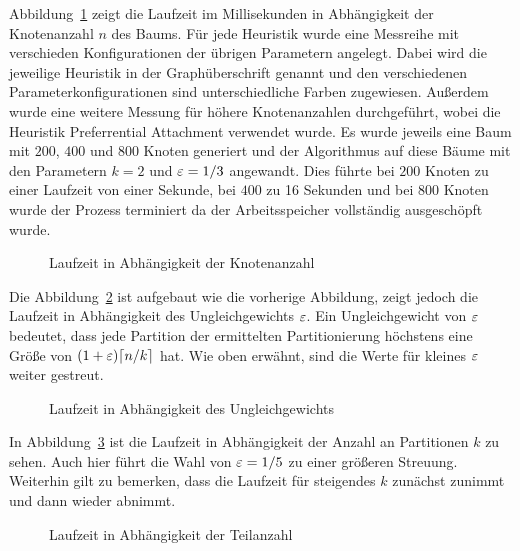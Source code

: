 Abbildung~\ref{fig:runnodes} zeigt die Laufzeit im Millisekunden in Abhängigkeit der Knotenanzahl $n$ des Baums.
Für jede Heuristik wurde eine Messreihe mit verschieden Konfigurationen der übrigen Parametern angelegt.
Dabei wird die jeweilige Heuristik in der Graphüberschrift genannt und den verschiedenen Parameterkonfigurationen sind unterschiedliche Farben zugewiesen. 
 Außerdem wurde eine weitere Messung für höhere Knotenanzahlen durchgeführt, wobei die Heuristik Preferrential Attachment verwendet wurde.
Es wurde jeweils eine Baum mit $200$, $400$ und $800$ Knoten generiert und der Algorithmus auf diese Bäume mit den Parametern $k = 2$ und $\varepsilon = 1/3$ angewandt.
Dies führte bei $200$ Knoten zu einer Laufzeit von einer Sekunde, bei $400$ zu 16 Sekunden und bei $800$ Knoten wurde der Prozess terminiert da der Arbeitsspeicher vollständig ausgeschöpft wurde.
\begin{figure}[t]
    \centering
    \scalebox{0.8}{}
    \caption{Laufzeit in Abhängigkeit der Knotenanzahl}\label{fig:runnodes}
\end{figure}

Die Abbildung~\ref{fig:runimb} ist aufgebaut wie die vorherige Abbildung, zeigt jedoch die Laufzeit in Abhängigkeit des Ungleichgewichts $\varepsilon$.
Ein Ungleichgewicht von $\varepsilon$ bedeutet, dass jede Partition der ermittelten Partitionierung höchstens eine Größe von $(1 + \varepsilon) \lceil n/k\rceil$ hat.
Wie oben erwähnt, sind die Werte für kleines $\varepsilon$ weiter gestreut.
\begin{figure}[t]
    \centering
    \scalebox{0.8}{}
    \caption{Laufzeit in Abhängigkeit des Ungleichgewichts}\label{fig:runimb}
\end{figure}

In Abbildung~\ref{fig:runkparts} ist die Laufzeit in Abhängigkeit der Anzahl an Partitionen $k$ zu sehen.
Auch hier führt die Wahl von $\varepsilon=1/5$ zu einer größeren Streuung.
Weiterhin gilt zu bemerken, dass die Laufzeit für steigendes $k$ zunächst zunimmt und dann wieder abnimmt.
\begin{figure}
    \centering
    \scalebox{0.8}{}
    \caption{Laufzeit in Abhängigkeit der Teilanzahl}\label{fig:runkparts}
\end{figure}

